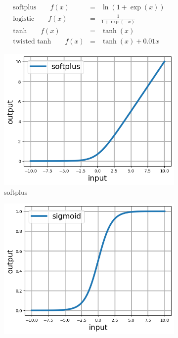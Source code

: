 \documentclass[12pt]{article}
\newcommand{\ber}{\begin{eqnarray}}
\newcommand{\eer}{\end{eqnarray}}
\begin{document}
% 
\begin{subequations}
\ber
\text{softplus}\qquad f(x) &=& \ln(1+\exp(x)) \label{eqn:softplus}\\
\text{logistic}\qquad f(x) &=& \frac{1}{1+\exp(-x)}\label{eqn:logistic}\\
\text{tanh} \qquad f(x) &=& \tanh(x) \label{eqn:tanh}\\
\text{twisted tanh} \qquad f(x) &=& \tanh(x) + 0.01x  \label{eqn:twisttanh}
\eer
\label{eqn:activations}
\end{subequations}
%
\begin{figure}[h]
  \centering
  \begin{subfigure}[b]{0.45\linewidth}
    \includegraphics[totalheight=4cm]{Figures/scripts/softplus.png}
    \caption{softplus}
  \end{subfigure}
  \begin{subfigure}[b]{0.45\linewidth}
    \includegraphics[totalheight=4cm]{Figures/scripts/logistic.png}

\end{subfigure}
\end{figure}
\end{document}

